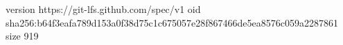 version https://git-lfs.github.com/spec/v1
oid sha256:b64f3eafa789d153a0f38d75c1c675057e28f867466de5ea8576c059a2287861
size 919

